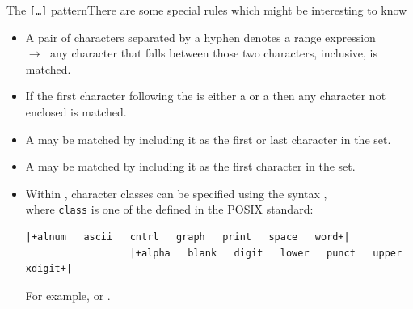\begin{frame}[fragile]{The \texttt{[\ldots]} pattern}{There are some special rules which might be interesting to know}
    \begin{itemize}
        \item A pair of characters separated by a hyphen denotes a range expression\\
              $\to\;$ any character that falls between those two characters, inclusive, is matched.
        \item If the first character following the \PB{\texttt{[}} is either a \PP{\texttt{!}} or a \PP{\texttt{\^{}}} then any character not enclosed is matched.
        \item A \PP{\texttt{-}} may be matched by including it as the first or last character in the set.
        \item A \PP{\texttt{]}} may be matched by including it as the first character in the set.
        \item Within \PB{\texttt{[\ldots]}}, character classes can be specified using the syntax \PB{\texttt{[:class:]}},\\
              where \texttt{class} is one of the  defined in the POSIX standard:
              \begin{lstlisting}[style=MyBash, numbers=none, xleftmargin=2mm, xrightmargin=15mm, aboveskip=3mm, belowskip=-5mm]
                  |+alnum   ascii   cntrl   graph   print   space   word+|
                  |+alpha   blank   digit   lower   punct   upper   xdigit+|
              \end{lstlisting}
              For example, \PB{\texttt{[[:digit:]]}} or \PB{\texttt{[[:blank:]]}}.
    \end{itemize}
\end{frame}
